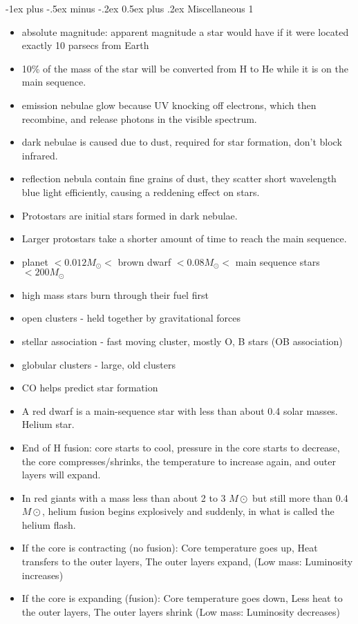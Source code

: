 \documentclass[10pt,landscape]{article}
\makeatletter
\renewcommand{\section}{\@startsection{section}{1}{0mm}%
                                {-1ex plus -.5ex minus -.2ex}%
                                {0.5ex plus .2ex}%
                                {\normalfont\large\bfseries}}
\makeatother
\begin{document}
\begin{multicols}{3}
\section{Miscellaneous 1}
\begin{itemize}
    \item absolute magnitude: apparent magnitude a star would have if it were located exactly 10 parsecs from Earth
    \item 10\% of the mass of the star will be converted from H to He while it is on the main sequence.
    \item emission nebulae glow because UV knocking off electrons, which then recombine, and release photons in the visible spectrum.
    \item dark nebulae is caused due to dust, required for star formation, don't block infrared.
    \item reflection nebula contain fine grains of dust, they scatter short wavelength blue light efficiently, causing a reddening effect on stars.
    \item Protostars are initial stars formed in dark nebulae. 
    \item Larger protostars take a shorter amount of time to reach the main sequence.
    \item planet $< 0.012 M_\odot <$ brown dwarf $< 0.08 M_\odot <$ main sequence stars $< 200 M_\odot$
    \item high mass stars burn through their fuel first
    \item open clusters - held together by gravitational forces
    \item stellar association - fast moving cluster, mostly O, B stars (OB association)
    \item globular clusters - large, old clusters
    \item CO helps predict star formation
    \item A red dwarf is a main-sequence star with less than about 0.4 solar masses. Helium star.
    \item End of H fusion: core starts to cool, pressure in the core starts to decrease, the core compresses/shrinks, the temperature to increase again, and outer layers will expand.
    \item In red giants with a mass less than about 2 to 3 $M\odot$ but still more than 0.4 $M\odot$, helium fusion begins explosively and suddenly, in what is called the helium flash. 
    \item If the core is contracting (no fusion): Core temperature goes up, Heat transfers to the outer layers, The outer layers expand, (Low mass: Luminosity increases)
    \item If the core is expanding (fusion): Core temperature goes down, Less heat to the outer layers, The outer layers shrink (Low mass: Luminosity decreases)
\end{itemize}

\end{multicols}
\end{document}
